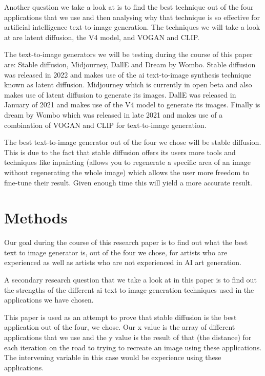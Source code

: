 \documentclass[]{report}
\begin{document}
Another question we take a look at is to find the best technique out of the four applications that we use and then analysing why that technique is so effective for artificial intelligence text-to-image generation. The techniques we will take a look at are latent diffusion, the V4 model, and VOGAN and CLIP.

The text-to-image generators we will be testing during the course of this paper are: Stable diffusion, Midjourney, DallE and Dream by Wombo. Stable diffusion was released in 2022 and makes use of the ai text-to-image synthesis technique known as latent diffusion. Midjourney which is currently in open beta and also makes use of latent diffusion to generate its images. DallE was released in January of 2021 and makes use of the V4 model to generate its images. Finally is dream by Wombo which was released in late 2021 and makes use of a combination of VOGAN and CLIP for text-to-image generation.

The best text-to-image generator out of the four we chose will be stable diffusion. This is due to the fact that stable diffusion offers its users more tools and techniques like inpainting (allows you to regenerate a specific area of an image without regenerating the whole image) which allows the user more freedom to fine-tune their result. Given enough time this will yield a more accurate result. 
	

	
	\section{Methods}
	
	Our goal during the course of this research paper is to find out what the best text to image generator is, out of the four we chose, for artists who are experienced as well as artists who are not experienced in AI art generation.
	
	A secondary research question that we take a look at in this paper is to find out the strengths of the different ai text to image generation techniques used in the applications we have chosen.
	
	This paper is used as an attempt to prove that stable diffusion is the best application out of the four, we chose. Our x value is the array of different applications that we use and the y value is the result of that (the distance) for each iteration on the road to trying to recreate an image using these applications. The intervening variable in this case would be experience using these applications.
	
\end{document}
